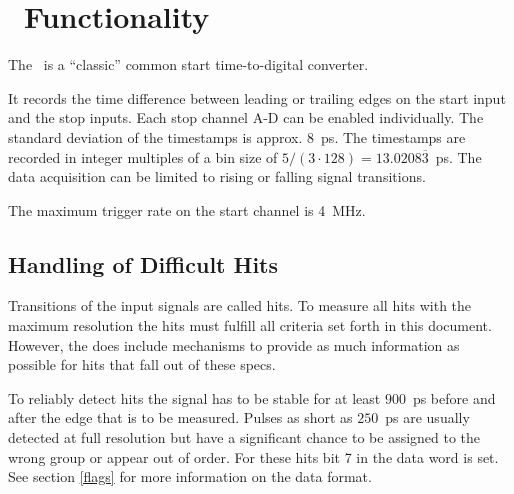 \section{\deviceName\ Functionality}
	The \deviceName\ is a ``classic'' common start time-to-digital converter. 

	 { %
		It records the time difference between leading or trailing edges on the start input and the stop inputs. 
		Each stop channel A-D can be enabled individually. 
		The standard deviation of the timestamps is approx. $8$~ps. 
		The timestamps are recorded in integer multiples of a bin size of $5/(3\cdot 128) = 13.0208\overline{3}$~ps. 
		The data acquisition can be limited to rising or falling signal transitions. 
		
		The maximum trigger rate on the start channel is 4~MHz.
		
		\subsection{Handling of Difficult Hits}
			\label{difficulthits}
			Transitions of the input signals are called hits. To measure all hits with the maximum resolution the hits must fulfill all criteria set forth in this document.
			However, the \deviceName does include mechanisms to provide as much information as possible for hits that fall out of these specs.
		
			To reliably detect hits the signal has to be stable for at least $900$~ps before and after the edge that is to be measured. 
			Pulses as short as $250$~ps are usually detected at full resolution but have a significant chance to be assigned to the wrong group or appear out of order. 
			For these hits bit 7 in the data word is set. See section \ref{flags} for more information on the data format.

}

